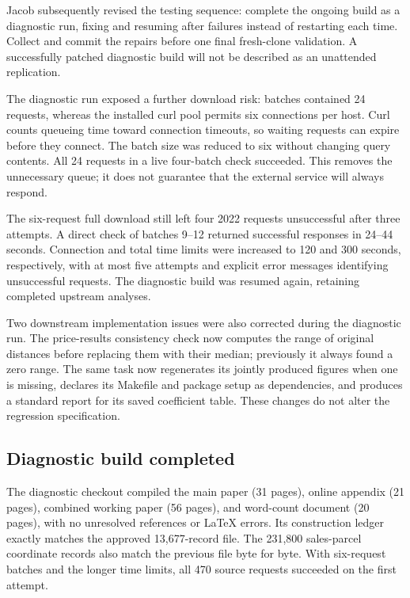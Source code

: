 Jacob subsequently revised the testing sequence: complete the ongoing build as
a diagnostic run, fixing and resuming after failures instead of restarting each
time. Collect and commit the repairs before one final fresh-clone validation.
A successfully patched diagnostic build will not be described as an unattended
replication.

The diagnostic run exposed a further download risk: batches contained 24 requests,
whereas the installed curl pool permits six connections per host. Curl counts
queueing time toward connection timeouts, so waiting requests can expire before
they connect. The batch size was reduced to six without changing query contents.
All 24 requests in a live four-batch check succeeded. This removes the unnecessary
queue; it does not guarantee that the external service will always respond.

The six-request full download still left four 2022 requests unsuccessful after
three attempts. A direct check of batches 9--12 returned successful responses
in 24--44 seconds. Connection and total time limits were increased to 120 and
300 seconds, respectively, with at most five attempts and explicit error
messages identifying unsuccessful requests. The diagnostic build was resumed
again, retaining completed upstream analyses.

Two downstream implementation issues were also corrected during the diagnostic
run. The price-results consistency check now computes the range of original
distances before replacing them with their median; previously it always found
a zero range. The same task now regenerates its jointly produced figures when
one is missing, declares its Makefile and package setup as dependencies, and
produces a standard report for its saved coefficient table. These changes do
not alter the regression specification.

\subsection*{Diagnostic build completed}
The diagnostic checkout compiled the main paper (31 pages), online appendix
(21 pages), combined working paper (56 pages), and word-count document
(20 pages), with no unresolved references or LaTeX errors. Its construction
ledger exactly matches the approved 13,677-record file. The 231,800 sales-parcel
coordinate records also match the previous file byte for byte. With six-request
batches and the longer time limits, all 470 source requests succeeded on the
first attempt.

